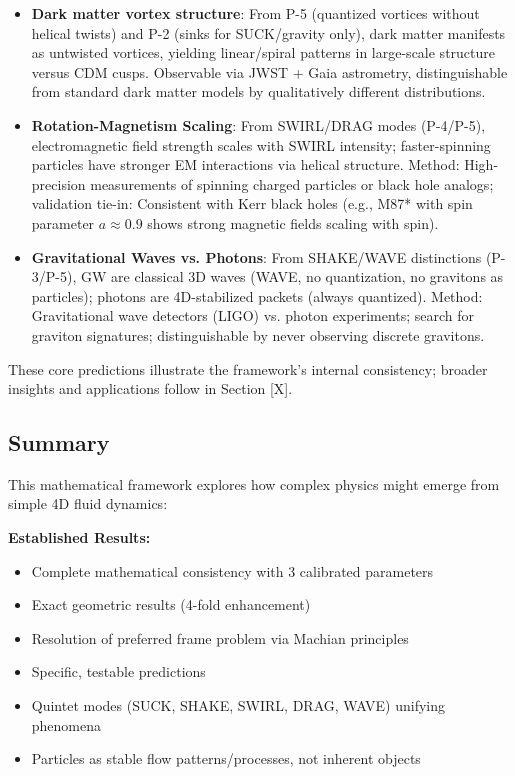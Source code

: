 \begin{itemize}
\item \textbf{Dark matter vortex structure}: From P-5 (quantized vortices without helical twists) and P-2 (sinks for SUCK/gravity only), dark matter manifests as untwisted vortices, yielding linear/spiral patterns in large-scale structure versus CDM cusps. Observable via JWST + Gaia astrometry, distinguishable from standard dark matter models by qualitatively different distributions.
\item \textbf{Rotation-Magnetism Scaling}: From SWIRL/DRAG modes (P-4/P-5), electromagnetic field strength scales with SWIRL intensity; faster-spinning particles have stronger EM interactions via helical structure. Method: High-precision measurements of spinning charged particles or black hole analogs; validation tie-in: Consistent with Kerr black holes (e.g., M87* with spin parameter $a \approx 0.9$ shows strong magnetic fields scaling with spin).
\item \textbf{Gravitational Waves vs. Photons}: From SHAKE/WAVE distinctions (P-3/P-5), GW are classical 3D waves (WAVE, no quantization, no gravitons as particles); photons are 4D-stabilized packets (always quantized). Method: Gravitational wave detectors (LIGO) vs. photon experiments; search for graviton signatures; distinguishable by never observing discrete gravitons.
\end{itemize}

These core predictions illustrate the framework's internal consistency; broader insights and applications follow in Section [X].

\subsection{Summary}

This mathematical framework explores how complex physics might emerge from simple 4D fluid dynamics:

\textbf{Established Results:}
\begin{itemize}
\item Complete mathematical consistency with 3 calibrated parameters
\item Exact geometric results (4-fold enhancement)
\item Resolution of preferred frame problem via Machian principles
\item Specific, testable predictions
\item Quintet modes (SUCK, SHAKE, SWIRL, DRAG, WAVE) unifying phenomena
\item Particles as stable flow patterns/processes, not inherent objects
\end{itemize}

